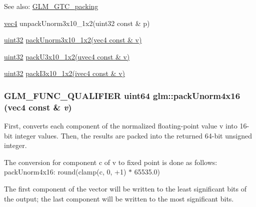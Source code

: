 \begin{Desc}
\item[See also:]\hyperlink{group__gtc__packing}{GLM\_\-GTC\_\-packing} 

\hyperlink{group__core__types_g5881b1b022d7fd1b7218f5916532dd02}{vec4} unpackUnorm3x10\_\-1x2(uint32 const \& p) 

\hyperlink{group__gtc__type__precision_g202b6a53c105fcb7e531f9b443518451}{uint32} \hyperlink{group__gtc__packing_g2cf2d11b40bd48639110456fd74c2e33}{packUnorm3x10\_\-1x2(vec4 const \& v)} 

\hyperlink{group__gtc__type__precision_g202b6a53c105fcb7e531f9b443518451}{uint32} \hyperlink{group__gtc__packing_gf656d8862628f96b20de7a36eaa1fe56}{packU3x10\_\-1x2(uvec4 const \& v)} 

\hyperlink{group__gtc__type__precision_g202b6a53c105fcb7e531f9b443518451}{uint32} \hyperlink{group__gtc__packing_g032e18fa5bc5b8f3897104aeb2f1e195}{packI3x10\_\-1x2(ivec4 const \& v)} \end{Desc}
\hypertarget{group__gtc__packing_gc561f06c908b7302537a8ef29fcb409e}{
\subsubsection[packUnorm4x16]{\setlength{\rightskip}{0pt plus 5cm}GLM\_\-FUNC\_\-QUALIFIER uint64 glm::packUnorm4x16 (vec4 const \& {\em v})}}
\label{group__gtc__packing_gc561f06c908b7302537a8ef29fcb409e}


First, converts each component of the normalized floating-point value v into 16-bit integer values. Then, the results are packed into the returned 64-bit unsigned integer.

The conversion for component c of v to fixed point is done as follows: packUnorm4x16: round(clamp(c, 0, +1) $\ast$ 65535.0)

The first component of the vector will be written to the least significant bits of the output; the last component will be written to the most significant bits.

